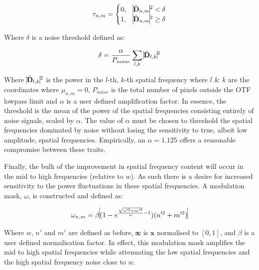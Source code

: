 \begin{equation}\label{eq:noise_threshold_mask}
\tau_{n,m} = 
\begin{cases}
0, & \vline \tilde{\textbf{D}}_{n,m} \vline^2 < \delta\\
1, & \vline \tilde{\textbf{D}}_{n,m} \vline^2 \ge \delta\\ 
\end{cases}
\end{equation}

Where $\delta$ is a noise threshold defined as:

\begin{equation}\label{eq:noise_threshold}
\delta = \frac{\alpha}{P_{noise}}\sum\limits_{l,k}{\vline \tilde{\textbf{D}}_{l,k} \vline^2}
\end{equation}

Where $\vline \tilde{\textbf{D}}_{l,k} \vline^2$ is the power in the 
$l$-th, $k$-th spatial frequency where $l$ \& $k$ are the coordinates 
where $\mu_{n,m} = 0$, $P_{noise}$ is the total number of pixels 
outside the OTF lowpass limit and $\alpha$ is a user defined 
amplification factor. In essence, the threshold is the mean of the
power of the spatial frequencies consisting entirely of noise signals,
scaled by $\alpha$.	The value of $\alpha$ must be chosen to threshold
the spatial frequencies dominated by noise without losing the sensitivity
to true, albeit low amplitude, spatial frequencies. Empirically, an 
$\alpha = 1.125$ offers a reasonable compromise between these traits.

Finally, the bulk of the improvement in spatial frequency content will
occur in the mid to high frequencies (relative to $w$). As such there is 
a desire for increased sensitivity to the power fluctuations in these 
spatial frequencies. A modulation mask, $\omega$, is constructed and 
defined as:

\begin{equation}\label{eq:attenuation_mask_norm_and_scaled}
\omega_{n,m} = \beta \vline (1 - e^{\frac{\sqrt{n'^{2} + m'^{2}}}{w}-1}) (n'^{2} + m'^{2}) \vline
\end{equation}

Where $w$, $n'$ and $m'$ are defined as before, $\vline\textbf{x} \vline$ 
is $\textbf{x}$ normalised to $[0,1]$, and $\beta$ is a user defined 
normalisation factor. In effect, this modulation mask amplifies the mid 
to high spatial frequencies while attenuating the low spatial frequencies 
and the high spatial frequency noise close to $w$.

